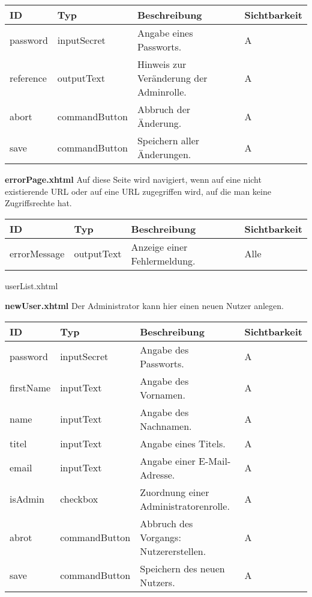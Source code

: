 \begin{tabular}[H]{|m{2cm}|m{3cm}|m{6cm}|m{2.5cm}|}
    \hline
    \textbf{ID} & \textbf{Typ} & \textbf{Beschreibung} & \textbf{Sichtbarkeit} \\
    \hline
    \hline
    password & inputSecret & Angabe eines Passworts. & A\\
    \hline
    reference & outputText & Hinweis zur Veränderung der Adminrolle. & A\\
    \hline
    abort & commandButton & Abbruch der Änderung. & A\\
    \hline
    save & commandButton & Speichern aller Änderungen. & A\\
    \hline
\end{tabular}


\textbf{errorPage.xhtml} Auf diese Seite wird navigiert, wenn auf eine nicht existierende URL oder auf eine URL zugegriffen wird, auf die man keine Zugriffsrechte hat.

\begin{tabular}[H]{|m{2cm}|m{3cm}|m{6cm}|m{2.5cm}|}
    \hline
    \textbf{ID} & \textbf{Typ} & \textbf{Beschreibung} & \textbf{Sichtbarkeit} \\
    \hline
    \hline
    errorMessage & outputText & Anzeige einer Fehlermeldung. & Alle\\
    \hline
\end{tabular}

userList.xhtml

\textbf{newUser.xhtml} Der Administrator kann hier einen neuen Nutzer anlegen.

\begin{tabular}[H]{|m{2cm}|m{3cm}|m{6cm}|m{2.5cm}|}
    \hline
    \textbf{ID} & \textbf{Typ} & \textbf{Beschreibung} & \textbf{Sichtbarkeit} \\
    \hline
    \hline
    password & inputSecret & Angabe des Passworts. & A\\
    \hline
    firstName & inputText & Angabe des Vornamen. & A\\
    \hline
    name & inputText & Angabe des Nachnamen. & A\\
    \hline
    titel & inputText & Angabe eines Titels. & A\\
    \hline
    email & inputText & Angabe einer E-Mail-Adresse. & A\\
    \hline
    isAdmin & checkbox & Zuordnung einer Administratorenrolle. & A\\
    \hline
    abrot & commandButton & Abbruch des Vorgangs: Nutzererstellen. & A\\
    \hline
    save & commandButton & Speichern des neuen Nutzers. & A \\
    \hline
\end{tabular}

